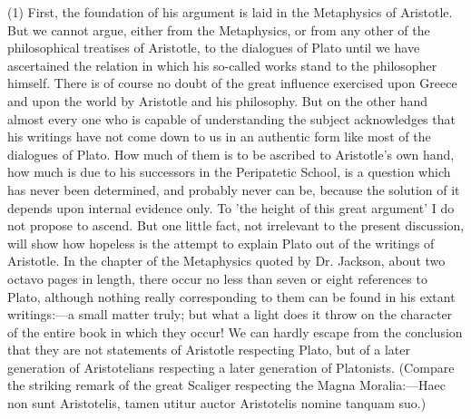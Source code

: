 \documentclass[11pt,letter]{article}
\begin{document}
\par  (1) First, the foundation of his argument is laid in the Metaphysics of Aristotle. But we cannot argue, either from the Metaphysics, or from any other of the philosophical treatises of Aristotle, to the dialogues of Plato until we have ascertained the relation in which his so-called works stand to the philosopher himself. There is of course no doubt of the great influence exercised upon Greece and upon the world by Aristotle and his philosophy. But on the other hand almost every one who is capable of understanding the subject acknowledges that his writings have not come down to us in an authentic form like most of the dialogues of Plato. How much of them is to be ascribed to Aristotle's own hand, how much is due to his successors in the Peripatetic School, is a question which has never been determined, and probably never can be, because the solution of it depends upon internal evidence only. To 'the height of this great argument' I do not propose to ascend. But one little fact, not irrelevant to the present discussion, will show how hopeless is the attempt to explain Plato out of the writings of Aristotle. In the chapter of the Metaphysics quoted by Dr. Jackson, about two octavo pages in length, there occur no less than seven or eight references to Plato, although nothing really corresponding to them can be found in his extant writings:—a small matter truly; but what a light does it throw on the character of the entire book in which they occur! We can hardly escape from the conclusion that they are not statements of Aristotle respecting Plato, but of a later generation of Aristotelians respecting a later generation of Platonists. (Compare the striking remark of the great Scaliger respecting the Magna Moralia:—Haec non sunt Aristotelis, tamen utitur auctor Aristotelis nomine tanquam suo.)
\end{document}
